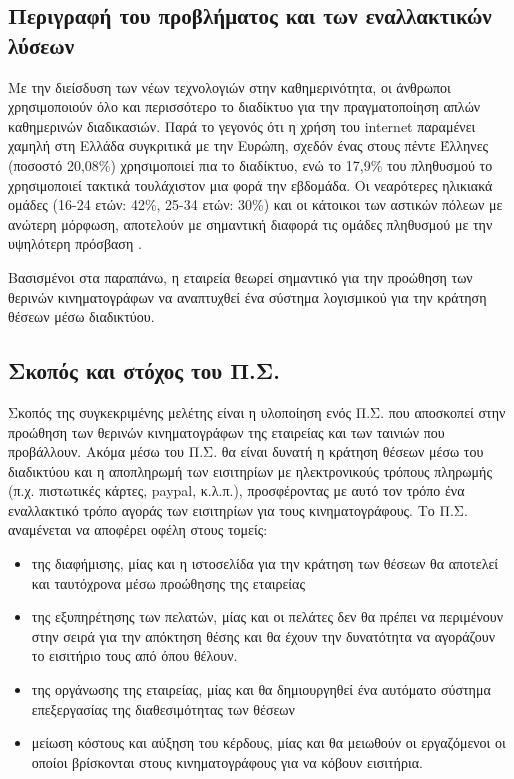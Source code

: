 \documentclass{assignment}
\begin{document}
\subsection{Περιγραφή του προβλήματος και των εναλλακτικών λύσεων}

Με την διείσδυση των νέων τεχνολογιών στην καθημερινότητα, οι άνθρωποι χρησιμοποιούν όλο και περισσότερο το διαδίκτυο για την πραγματοποίηση απλών καθημερινών διαδικασιών. Παρά το γεγονός ότι η χρήση του internet παραμένει χαμηλή στη Ελλάδα συγκριτικά με την Ευρώπη, σχεδόν ένας στους πέντε Έλληνες (ποσοστό 20,08\%) χρησιμοποιεί πια το διαδίκτυο, ενώ το 17,9\% του πληθυσμού το χρησιμοποιεί τακτικά τουλάχιστον μια φορά την εβδομάδα. Οι νεαρότερες ηλικιακά ομάδες (16-24 ετών: 42\%, 25-34 ετών: 30\%) και οι κάτοικοι των αστικών πόλεων με ανώτερη μόρφωση, αποτελούν με σημαντική διαφορά τις ομάδες πληθυσμού με την υψηλότερη πρόσβαση \cite{infosoc}. 

Βασισμένοι στα παραπάνω, η εταιρεία θεωρεί σημαντικό για την προώθηση των θερινών κινηματογράφων να αναπτυχθεί ένα σύστημα λογισμικού για την κράτηση θέσεων μέσω διαδικτύου.

\subsection{Σκοπός και στόχος του Π.Σ.}

Σκοπός της συγκεκριμένης μελέτης είναι η υλοποίηση ενός Π.Σ. που αποσκοπεί στην προώθηση των θερινών κινηματογράφων της εταιρείας και των ταινιών που προβάλλουν. Ακόμα μέσω του Π.Σ. θα είναι δυνατή η κράτηση θέσεων μέσω του διαδικτύου και η αποπληρωμή των εισιτηρίων με ηλεκτρονικούς τρόπους πληρωμής (π.χ. πιστωτικές κάρτες, paypal, κ.λ.π.), προσφέροντας με αυτό τον τρόπο ένα εναλλακτικό τρόπο αγοράς των εισιτηρίων για τους κινηματογράφους. Το Π.Σ. αναμένεται να αποφέρει οφέλη στους τομείς:

\begin{itemize}
\item της διαφήμισης, μίας και η ιστοσελίδα για την κράτηση των θέσεων θα αποτελεί και ταυτόχρονα μέσω προώθησης της εταιρείας
\item της εξυπηρέτησης των πελατών, μίας και οι πελάτες δεν θα πρέπει να περιμένουν στην σειρά για την απόκτηση θέσης και θα έχουν την δυνατότητα να αγοράζουν το εισιτήριο τους από όπου θέλουν.
\item της οργάνωσης της εταιρείας, μίας και θα δημιουργηθεί ένα αυτόματο σύστημα επεξεργασίας της διαθεσιμότητας των θέσεων
\item μείωση κόστους και αύξηση του κέρδους, μίας και θα μειωθούν οι εργαζόμενοι οι οποίοι βρίσκονται στους κινηματογράφους για να κόβουν εισιτήρια. 
\end{itemize}
\end{document}
